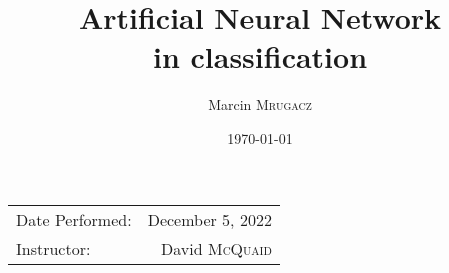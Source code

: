 \documentclass[
	letterpaper, %
	10pt, %
]{CSUniSchoolLabReport}
\title{Artificial Neural Network \\ in classification} %
\author{Marcin \textsc{Mrugacz}} %
\date{\today} %
\begin{document}
\maketitle %

\begin{center}
	\begin{tabular}{l r}
		Date Performed: & December 5, 2022 \\ %
		Instructor: & David \textsc{McQuaid} %
	\end{tabular}
\end{center}



\pagebreak

\tableofcontents

\pagebreak
{}

\clearpage





\clearpage

\pagebreak

\begin{appendix}
	\listoffigures
	\listoftables
	\printbibliography %
\end{appendix}


\pagebreak
\end{document}
